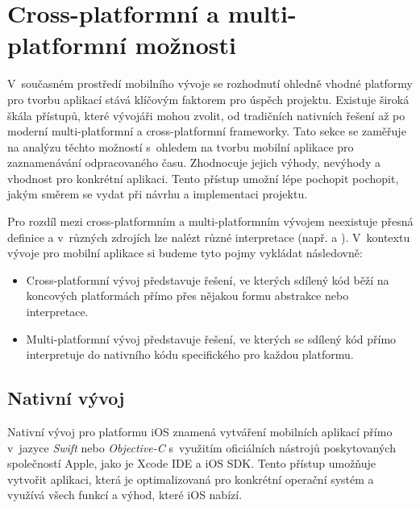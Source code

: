 \section{Cross-platformní a multi-platformní možnosti}

V~současném prostředí mobilního vývoje se rozhodnutí ohledně vhodné platformy pro tvorbu aplikací stává klíčovým faktorem pro úspěch projektu. Existuje široká škála přístupů, které vývojáři mohou zvolit, od tradičních nativních řešení až po moderní multi-platformní a cross-platformní frameworky. Tato sekce se zaměřuje na analýzu těchto možností s~ohledem na tvorbu mobilní aplikace pro zaznamenávání odpracovaného času. Zhodnocuje jejich výhody, nevýhody a vhodnost pro konkrétní aplikaci. Tento přístup umožní lépe pochopit pochopit, jakým směrem se vydat při návrhu a implementaci projektu.

Pro rozdíl mezi cross-platformním a multi-platformním vývojem neexistuje přesná definice a v~různých zdrojích lze nalézt různé interpretace (např. \cite{cross-multiplatform-alternative-intepretation-one} a \cite{cross-multiplatform-alternative-intepretation-two}). V~kontextu vývoje pro mobilní aplikace si budeme tyto pojmy vykládat následovně:
\begin{itemize}
\item Cross-platformní vývoj představuje řešení, ve kterých sdílený kód běží na koncových platformách přímo přes nějakou formu abstrakce nebo interpretace.
\item Multi-platformní vývoj představuje řešení, ve kterých se sdílený kód přímo interpretuje do nativního kódu specifického pro každou platformu.
\end{itemize}

\subsection{Nativní vývoj}

Nativní vývoj pro platformu iOS znamená vytváření mobilních aplikací přímo v~jazyce \emph{Swift} nebo \emph{Objective-C} s~využitím oficiálních nástrojů poskytovaných společností Apple, jako je Xcode IDE a iOS SDK. Tento přístup umožňuje vytvořit aplikaci, která je optimalizovaná pro konkrétní operační systém a využívá všech funkcí a výhod, které iOS nabízí.

